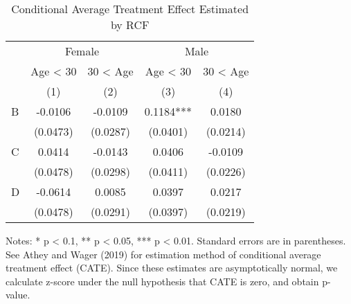 \documentclass[
  lualatex,
  11pt,
  a4paper
]{article}
\begin{document}
\begin{table}[H]

\caption{\label{tab:rcf-int-cate}Conditional Average Treatment Effect Estimated by RCF}
\centering
\fontsize{9}{11}\selectfont
\begin{threeparttable}
\begin{tabular}[t]{lcccc}
\toprule
\multicolumn{1}{c}{ } & \multicolumn{2}{c}{Female} & \multicolumn{2}{c}{Male} \\
\cmidrule(l{3pt}r{3pt}){2-3} \cmidrule(l{3pt}r{3pt}){4-5}
\multicolumn{1}{c}{ } & \multicolumn{1}{c}{Age < 30} & \multicolumn{1}{c}{30 < Age} & \multicolumn{1}{c}{Age < 30} & \multicolumn{1}{c}{30 < Age} \\
\cmidrule(l{3pt}r{3pt}){2-2} \cmidrule(l{3pt}r{3pt}){3-3} \cmidrule(l{3pt}r{3pt}){4-4} \cmidrule(l{3pt}r{3pt}){5-5}
 & (1) & (2) & (3) & (4)\\
\midrule
B & -0.0106 & -0.0109 & 0.1184*** & 0.0180\\
 & (0.0473) & (0.0287) & (0.0401) & (0.0214)\\
C & 0.0414 & -0.0143 & 0.0406 & -0.0109\\
 & (0.0478) & (0.0298) & (0.0411) & (0.0226)\\
D & -0.0614 & 0.0085 & 0.0397 & 0.0217\\
 & (0.0478) & (0.0291) & (0.0397) & (0.0219)\\
\bottomrule
\end{tabular}
\begin{tablenotes}
\item Notes: * p < 0.1, ** p < 0.05, *** p < 0.01. Standard errors are in parentheses. See Athey and Wager (2019) for estimation method of conditional average treatment effect (CATE). Since these estimates are asymptotically normal, we calculate z-score under the null hypothesis that CATE is zero, and obtain p-value. 
\end{tablenotes}
\end{threeparttable}
\end{table}
\end{document}
